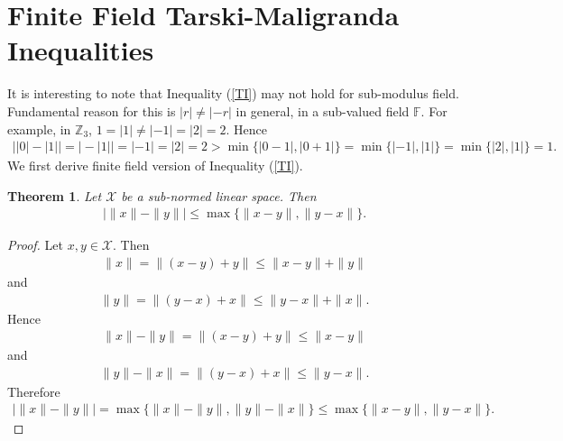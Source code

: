\documentclass{amsart}
\newtheorem{theorem}{Theorem}[section]
\begin{document}
\section{Finite Field  Tarski-Maligranda Inequalities}
It is interesting to note that Inequality (\ref{TI}) may not hold for sub-modulus field. Fundamental reason for this is $|r|\neq |-r|$ in general, in a sub-valued field $\mathbb{F}$. 
For example, in $\mathbb{Z}_3$, $1=|1| \neq |-1|=|2|=2$. Hence 
\begin{align*}
		\bigg||0|-|1|\bigg|=\bigg|-|1|\bigg|=|-1|=|2|=2> \min\{|0-1|, |0+1|\}=\min\{|-1|, |1|\}=\min\{|2|, |1|\}=1.
\end{align*}
We first derive finite field version of Inequality (\ref{TI}). 
\begin{theorem}
Let $\mathcal{X}$ be a sub-normed linear space. Then 
\begin{align*}
		\bigg|\|x\|-\|y\|\bigg|\leq \max\{\|x-y\|, \|y-x\|\}.
\end{align*}
\end{theorem}
\begin{proof}
		Let $x, y \in \mathcal{X}$. Then 
		\begin{align*}
			\|x\|=\|(x-y)+y\|\leq \|x-y\|+\|y\|
		\end{align*}
	and 
		\begin{align*}
		\|y\|=\|(y-x)+x\|\leq \|y-x\|+\|x\|.
	\end{align*}
Hence 
	\begin{align*}
	\|x\|-\|y\|=\|(x-y)+y\|\leq \|x-y\|
\end{align*}
and 
\begin{align*}
	\|y\|-\|x\|=\|(y-x)+x\|\leq \|y-x\|.
\end{align*}
Therefore 
\begin{align*}
		\bigg|\|x\|-\|y\|\bigg|=\max\{\|x\|-\|y\|, \|y\|-\|x\|\}\leq \max\{\|x-y\|, \|y-x\|\}.
\end{align*}
\end{proof}
\end{document}

